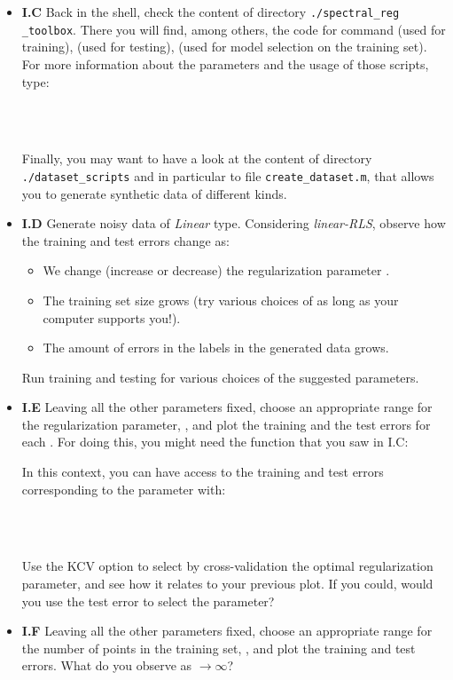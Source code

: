 \documentclass[DIN, pagenumber=false, fontsize=11pt, parskip=half]{scrartcl}
\begin{document}
\begin{itemize}
	\item \textbf{I.C} Back in the shell, check the content of directory \texttt{./spectral\_reg} \texttt{\_toolbox}.
	There you will find, among others, the code for command  (used for training),  (used for testing),  (used for model selection on the training set).
For more information about the parameters and the usage of those scripts, type:

\\
\\


Finally, you may want to have a look at the content of directory \texttt{./dataset\_scripts} and in particular to file \texttt{create\_dataset.m}, that  allows you to generate synthetic data of different kinds.
	\item \textbf{I.D} Generate noisy data of \emph{Linear} type. Considering \emph{linear-RLS}, observe how the training and test errors change as:

\begin{itemize}
  \item We change (increase or decrease) the regularization parameter .
  \item The training set size grows (try various choices of  as long as your computer supports you!).
  \item The amount of errors in the labels in the generated data grows.
\end{itemize}
Run training and testing for various choices of the suggested parameters.

	\item \textbf{I.E} Leaving all the other parameters fixed, choose an appropriate range for the regularization parameter, , and plot the training and the test errors for each .
For doing this, you might need the function  that you saw in I.C:


In this context, you can have access to the training and test errors corresponding to the parameter  with:

\\
\\



	Use the KCV option to select by cross-validation the optimal regularization parameter, and see how it relates to your previous plot.
	If you could, would you use the test error to select the parameter?

	\item \textbf{I.F} Leaving all the other parameters fixed, choose an appropriate range for the number of points in the training set, \mcode{nval=[n\_min:} \mcode{n\_step:n\_max]},  and plot the training and test errors.
	 What do you observe as  $\rightarrow \infty$?
\end{itemize}
\end{document}
